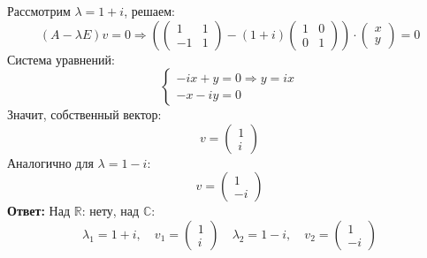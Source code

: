 \documentclass[a4paper]{article}
\newcommand{\RR}{\mathbb{R}}
\newcommand{\CC}{\mathbb{C}}
\begin{document}
\begin{enumerate}
\begin{enumerate}
    Рассмотрим \( \lambda = 1 + i \), решаем:
    \[
    (A - \lambda E)v = 0
    \Rightarrow
    \left(
    \begin{pmatrix}
    1 & 1 \\
    -1 & 1
    \end{pmatrix}
    -
    (1 + i)
    \begin{pmatrix}
    1 & 0 \\
    0 & 1
    \end{pmatrix}
    \right)
    \cdot
    \begin{pmatrix}
    x \\
    y
    \end{pmatrix}
    = 0
    \]
    Система уравнений:
    \[
    \begin{cases}
    -ix + y = 0 \Rightarrow y = ix \\
    - x - i y = 0
    \end{cases}
    \]
    Значит, собственный вектор:
    \[
    v = \begin{pmatrix} 1 \\ i \end{pmatrix}
    \]
    Аналогично для \( \lambda = 1 - i \):
    \[
    v = \begin{pmatrix} 1 \\ -i \end{pmatrix}
    \]
    \textbf{Ответ: } Над $\RR$: нету, над $\CC$:
    \[
    \lambda_1 = 1 + i,\quad v_1 = \begin{pmatrix} 1 \\ i \end{pmatrix}\quad
    \lambda_2 = 1 - i,\quad v_2 = \begin{pmatrix} 1 \\ -i \end{pmatrix}
    \]



   \end{enumerate}


\end{enumerate}
\end{document}
